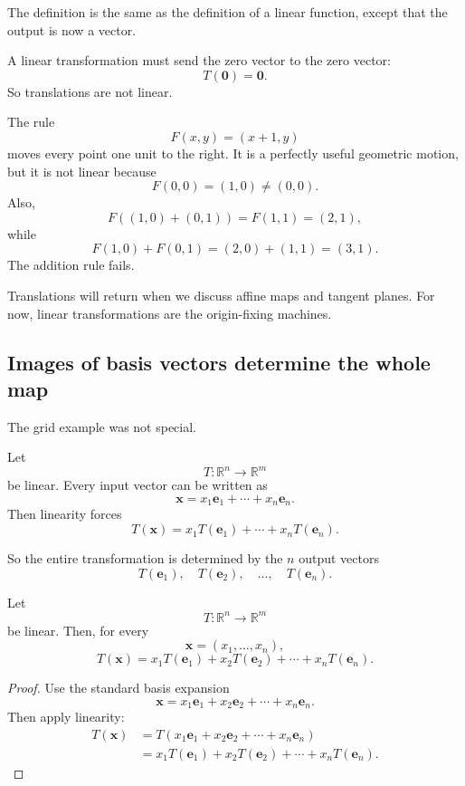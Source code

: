 The definition is the same as the definition of a linear function, except that the output
is now a vector.

A linear transformation must send the zero vector to the zero vector:
\[
    T(\mathbf 0)=\mathbf 0.
\]
So translations are not linear.

\begin{example}
The rule
\[
    F(x,y)=(x+1,y)
\]
moves every point one unit to the right.  It is a perfectly useful geometric motion, but
it is not linear because
\[
    F(0,0)=(1,0)\neq(0,0).
\]
Also,
\[
    F((1,0)+(0,1))=F(1,1)=(2,1),
\]
while
\[
    F(1,0)+F(0,1)=(2,0)+(1,1)=(3,1).
\]
The addition rule fails.
\end{example}

Translations will return when we discuss affine maps and tangent planes.  For now,
linear transformations are the origin-fixing machines.

\subsection{Images of basis vectors determine the whole map}

The grid example was not special.

Let
\[
    T:\mathbb R^n\to\mathbb R^m
\]
be linear.  Every input vector can be written as
\[
    \mathbf x=x_1\mathbf e_1+\cdots+x_n\mathbf e_n.
\]
Then linearity forces
\[
\boxed{
    T(\mathbf x)
    =
    x_1T(\mathbf e_1)+\cdots+x_nT(\mathbf e_n).
}
\]

So the entire transformation is determined by the \(n\) output vectors
\[
    T(\mathbf e_1),\quad T(\mathbf e_2),\quad \ldots,\quad T(\mathbf e_n).
\]

\begin{theorem}
Let
\[
    T:\mathbb R^n\to\mathbb R^m
\]
be linear.  Then, for every
\[
    \mathbf x=(x_1,\ldots,x_n),
\]
\[
\boxed{
    T(\mathbf x)
    =
    x_1T(\mathbf e_1)+x_2T(\mathbf e_2)+\cdots+x_nT(\mathbf e_n).
}
\]
\end{theorem}

\begin{proof}
Use the standard basis expansion
\[
    \mathbf x=x_1\mathbf e_1+x_2\mathbf e_2+\cdots+x_n\mathbf e_n.
\]
Then apply linearity:
\[
\begin{aligned}
T(\mathbf x)
&=
T(x_1\mathbf e_1+x_2\mathbf e_2+\cdots+x_n\mathbf e_n)\\
&=
x_1T(\mathbf e_1)+x_2T(\mathbf e_2)+\cdots+x_nT(\mathbf e_n).
\end{aligned}
\]
\end{proof}


